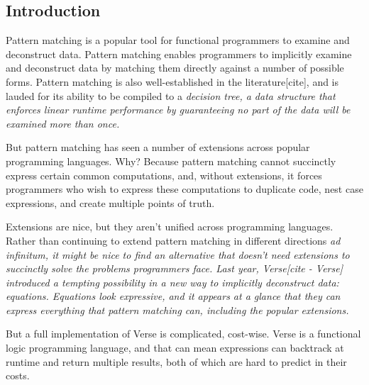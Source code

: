 \documentclass[manuscript,screen,review, 12pt, nonacm]{acmart}
\begin{document}
\maketitle
\begin{outline}[enumerate]
    


\section{Introduction}

Pattern matching is a popular tool for functional programmers to examine and
deconstruct data. Pattern matching enables programmers to implicitly examine and
deconstruct data by matching them directly against a number of possible forms.
Pattern matching is also well-established in the literature[cite], and is lauded
for its ability to be compiled to a \it{decision tree}, a data structure that
enforces linear runtime performance by guaranteeing no part of the data will be
examined more than once. 

But pattern matching has seen a number of extensions across popular programming
languages. Why? Because pattern matching cannot succinctly express certain
common computations, and, without extensions, it forces programmers who wish to
express these computations to duplicate code, nest case expressions, and create
multiple points of truth. 

Extensions are nice, but they aren't unified across programming languages.
Rather than continuing to extend pattern matching in different directions \it{ad
infinitum}, it might be nice to find an alternative that doesn't need extensions
to succinctly solve the problems programmers face. Last year, Verse[cite -
Verse] introduced a tempting possibility in a new way to implicitly deconstruct
data: equations. Equations look expressive, and it appears at a glance that they
can express everything that pattern matching can, including the popular
extensions. 

But a full implementation of Verse is complicated, cost-wise. Verse is a
functional logic programming language, and that can mean expressions can
backtrack at runtime and return multiple results, both of which are
hard to predict in their costs. 


\end{outline}
\end{document}
